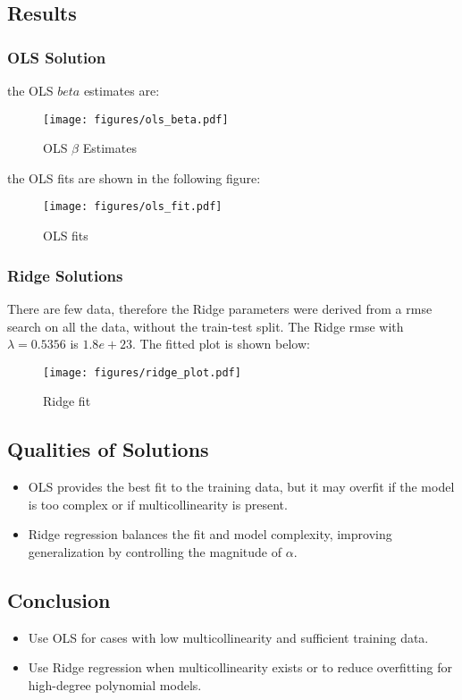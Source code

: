 \subsection*{Results}

\subsubsection*{OLS Solution}

the OLS $beta$ estimates  are:

\begin{figure}
    \centering
    \texttt{[image: figures/ols\_beta.pdf]}
    \caption{OLS $\beta$ Estimates}
\end{figure}

the OLS fits are shown in the following figure:

\begin{figure}
    \centering
    \texttt{[image: figures/ols\_fit.pdf]}
    \caption{OLS fits}
\end{figure}

\subsubsection*{Ridge Solutions}

There are few data, therefore the Ridge parameters were derived from a rmse search on all the data, without the train-test split.
The Ridge rmse with $\lambda = 0.5356$ is $1.8e+23$.
The fitted plot is shown below:
\begin{figure}
    \centering
    \texttt{[image: figures/ridge\_plot.pdf]}
    \caption{Ridge fit}
\end{figure}



\subsection*{Qualities of Solutions}
\begin{itemize}
    \item OLS provides the best fit to the training data, but it may overfit if the model is too complex or if multicollinearity is present.
    \item Ridge regression balances the fit and model complexity, improving generalization by controlling the magnitude of $\alpha$.
\end{itemize}

\subsection*{Conclusion}
\begin{itemize}
    \item Use OLS for cases with low multicollinearity and sufficient training data.
    \item Use Ridge regression when multicollinearity exists or to reduce overfitting for high-degree polynomial models.
\end{itemize}


